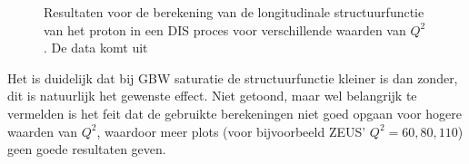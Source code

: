 \documentclass[a4paper,11pt]{article}
\numberwithin{equation}{section} %
\begin{document}
\begin{figure} [H]
{}
\caption{Resultaten voor de berekening van de longitudinale structuurfunctie van het proton in een DIS proces voor verschillende waarden van $Q^2$. De data komt uit \cite{H1}}
\label{fig:ResSF}
\end{figure}
Het is duidelijk dat bij GBW saturatie de structuurfunctie kleiner is dan zonder, dit is natuurlijk het gewenste effect.
Niet getoond, maar wel belangrijk te vermelden is het feit dat de gebruikte berekeningen niet goed opgaan voor hogere waarden van $Q^2$, waardoor meer plots (voor bijvoorbeeld ZEUS’ $Q^2=60, 80, 110$) geen goede resultaten geven.
\end{document}
